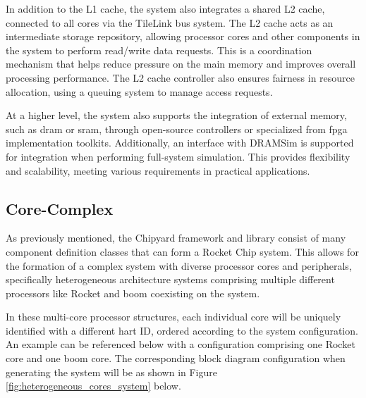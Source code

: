In addition to the L1 cache, the system also integrates a shared L2 cache, connected to all cores via the TileLink bus system. The L2 cache acts as an intermediate storage repository, allowing processor cores and other components in the system to perform read/write data requests. This is a coordination mechanism that helps reduce pressure on the main memory and improves overall processing performance. The L2 cache controller also ensures fairness in resource allocation, using a queuing system to manage access requests.

At a higher level, the system also supports the integration of external memory, such as \acrshort{dram} or \acrshort{sram}, through open-source controllers or specialized  from \acrshort{fpga} implementation toolkits. Additionally, an interface with DRAMSim is supported for integration when performing full-system simulation. This provides flexibility and scalability, meeting various requirements in practical applications.

\subsection{Core-Complex}
\label{subsec:core_complex}

As previously mentioned, the Chipyard framework and library consist of many component definition classes that can form a Rocket Chip system. This allows for the formation of a complex system with diverse processor cores and peripherals, specifically heterogeneous architecture systems comprising multiple different processors like Rocket and \acrshort{boom} coexisting on the system.

In these multi-core processor structures, each individual core will be uniquely identified with a different hart ID, ordered according to the system configuration. An example can be referenced below with a configuration comprising one Rocket core and one \acrshort{boom} core. The corresponding block diagram configuration when generating the system will be as shown in Figure \ref{fig:heterogeneous_cores_system} below.


